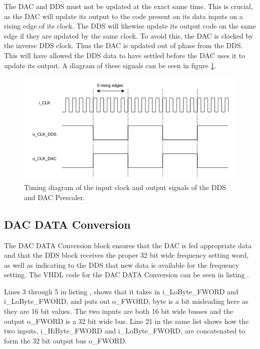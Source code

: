 The DAC and DDS must not be updated at the exact same time. This is crucial, as the DAC will update its output to the code present on its data inputs on a rising edge of its clock. The DDS will likewise update its output code on the same edge if they are updated by the same clock. To avoid this, the DAC is clocked by the inverse DDS clock. Thus the DAC is updated  out of phase from the DDS. This will have allowed the DDS data to have settled before the DAC uses it to update its output. A diagram of these signals can be seen in figure \ref{fig:7_2_3_DAC_PRESCALER}.

\begin{figure}[H]
    \centering
    \includegraphics[clip, trim=0 0 0 0, width=1\textwidth]{Sections/7_SystemDesign/Figures/DAC_PRESCALER.pdf}
    \caption{Timing diagram of the input clock and output signals of the DDS and DAC Prescaler.}
    \label{fig:7_2_3_DAC_PRESCALER}
\end{figure}

\subsection*{DAC DATA Conversion}
The DAC DATA Conversion block ensures that the DAC is fed appropriate data and that the DDS block receives the proper 32 bit wide frequency setting word, as well as indicating to the DDS that new data is available for the frequency setting. The VHDL code for the DAC DATA Conversion can be seen in listing .



Lines 3 through 5 in listing , shows that it takes in i\_LoByte\_FWORD and i\_LoByte\_FWORD, and puts out o\_FWORD, byte is a bit misleading here as they are 16 bit values. The two inputs are both 16 bit wide busses and the output o\_FWORD is a 32 bit wide bus. Line 21 in the same list shows how the two inputs, i\_HiByte\_FWORD and i\_LoByte\_FWORD, are concatenated to form the 32 bit output bus o\_FWORD.

